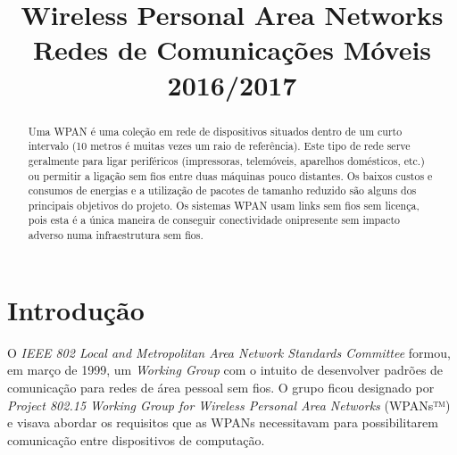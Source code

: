 \documentclass[conference]{IEEEtran}
\begin{document}
\title{Wireless Personal Area Networks\\
  \large Redes de Comunicações Móveis\\
  2016/2017
}

\author{
\and
{}
}

\maketitle

\begin{abstract}

Uma WPAN é uma coleção em rede de dispositivos situados dentro de um curto intervalo (10 metros é muitas vezes um raio de referência). Este tipo de rede serve geralmente para ligar periféricos (impressoras, telemóveis, aparelhos domésticos, etc.) ou permitir a ligação sem fios entre duas máquinas pouco distantes. Os baixos custos e consumos de energias e a utilização de pacotes de tamanho reduzido são alguns dos principais objetivos do projeto. Os sistemas WPAN usam links sem fios sem licença, pois esta é a única maneira de conseguir conectividade onipresente sem impacto adverso numa infraestrutura sem fios.

\end{abstract}


\IEEEpeerreviewmaketitle


\section{Introdução}

O \textit{IEEE 802 Local and Metropolitan Area Network Standards Committee} formou, em março de 1999, um \textit{Working Group} com o intuito de desenvolver padrões de comunicação para redes de área pessoal sem fios. 
O grupo ficou designado por \textit{Project 802.15 Working Group for Wireless Personal Area Networks} (WPANs™) e visava abordar os requisitos que as WPANs necessitavam para possibilitarem comunicação entre dispositivos de computação.
\end{document}

